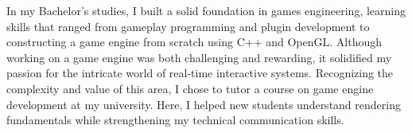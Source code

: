 In my Bachelor’s studies, I built a solid foundation in games engineering, 
learning skills that ranged from gameplay programming and plugin development to constructing 
a game engine from scratch using C++ and OpenGL. 
Although working on a game engine was both challenging and rewarding, 
it solidified my passion for the intricate world of real-time interactive systems. 
Recognizing the complexity and value of this area, 
I chose to tutor a course on game engine development at my university. 
Here, I helped new students understand rendering fundamentals while strengthening 
my technical communication skills.